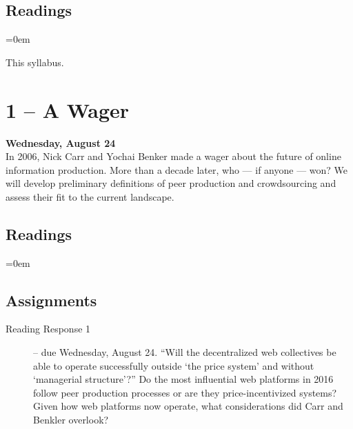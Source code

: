 \documentclass[10pt]{memoir}
\newenvironment{readinglist}{
\begin{list}{}{\leftmargin=8pt \itemindent=0em}
  \setlength{\itemsep}{8pt}
  \setlength{\parskip}{0em}
  \setlength{\parsep}{1em}
  \setlength{\parindent}{8em}}
{\end{list}}
\begin{document}
    \subsection{Readings}
    \begin{readinglist}
        \item This syllabus.
        \item {}
        \item {}
        \item {}
    \end{readinglist}

\section{1 -- A Wager}
\textcolor{CUGold}{\textbf{Wednesday, August 24}}\\
In 2006, Nick Carr and Yochai Benker made a wager about the future of online information production. More than a decade later, who --- if anyone --- won? We will develop preliminary definitions of peer production and crowdsourcing and assess their fit to the current landscape.

    \subsection{Readings}
    \begin{readinglist}
        \item {}
        \item {}
        \item {}
        \item {}
    \end{readinglist}

    \subsection{Assignments}
    \begin{description}%
        \item[Reading Response 1 ] -- due Wednesday, August 24. ``Will the decentralized web collectives be able to operate successfully outside `the price system' and without `managerial structure'?'' Do the most influential web platforms in 2016 follow peer production processes or are they price-incentivized systems? Given how web platforms now operate, what considerations did Carr and Benkler overlook?
    \end{description}
\end{document}
